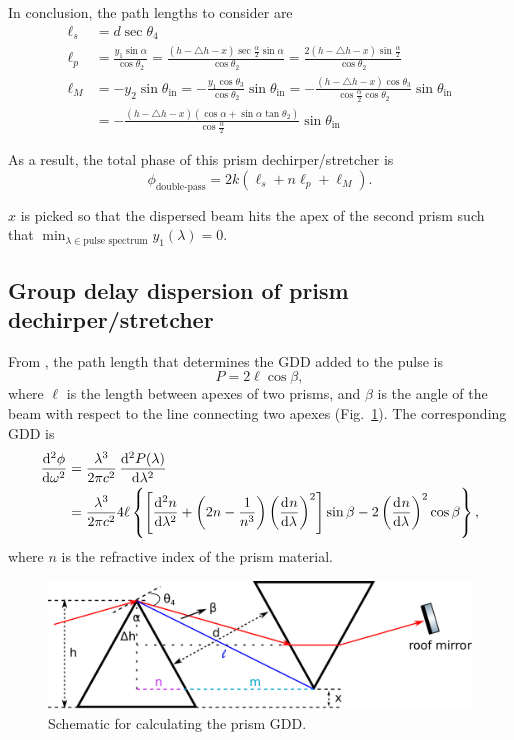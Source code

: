 \documentclass[12pt,hidelinks]{book}
\begin{document}
In conclusion, the path lengths to consider are
\begin{subequations}
\begin{align}
\ell_s & =d\sec\theta_4 \\
\ell_p & =\frac{y_1\sin\alpha}{\cos\theta_2}=\frac{\left(h-\triangle h-x\right)\sec\frac{\alpha}{2}\sin\alpha}{\cos\theta_2}=\frac{2\left(h-\triangle h-x\right)\sin\frac{\alpha}{2}}{\cos\theta_2} \\
\ell_M & =-y_2\sin\theta_{\text{in}}=-\frac{y_1\cos\theta_3}{\cos\theta_2}\sin\theta_{\text{in}}=-\frac{\left(h-\triangle h-x\right)\cos\theta_3}{\cos\frac{\alpha}{2}\cos\theta_2}\sin\theta_{\text{in}} \\
& =-\frac{\left(h-\triangle h-x\right)\left(\cos\alpha+\sin\alpha\tan\theta_2\right)}{\cos\frac{\alpha}{2}}\sin\theta_{\text{in}}
\end{align}
\end{subequations}

As a result, the total phase of this prism dechirper/stretcher is
\begin{equation}
\phi_{\text{double-pass}}=2k\left(\ell_s+n\ell_p+\ell_M\right).
\end{equation}

$x$ is picked so that the dispersed beam hits the apex of the second prism such that $\min_{\lambda\in\text{pulse spectrum}} y_1(\lambda)=0$.

\subsection{Group delay dispersion of prism dechirper/stretcher}
From \cite{Fork1984}, the path length that determines the GDD added to the pulse is 
\begin{equation}
P=2\ell\cos\beta,
\end{equation}
where $\ell$ is the length between apexes of two prisms, and $\beta$ is the angle of the beam with respect to the line connecting two apexes (Fig.~\ref{fig:prism_GDD}). The corresponding GDD is
\begin{align}
\dod[2]{\phi}{\omega} & =\frac{\lambda^3}{2\pi c^2}\dod[2]{P(\lambda)}{\lambda} \nonumber \\
& =\frac{\lambda^3}{2\pi c^2}4\ell\left\{\left[\dod[2]{n}{\lambda}+\left(2n-\frac{1}{n^3}\right)\left(\dod{n}{\lambda}\right)^2\right]\sin\beta-2\left(\dod{n}{\lambda}\right)^2\cos\beta\right\},
\label{eq:prism_GDD}
\end{align}
where $n$ is the refractive index of the prism material.
\begin{figure}[htbp]
\centering
\includegraphics[width=\linewidth]{prism_GDD.pdf}
\caption{Schematic for calculating the prism GDD.}
\label{fig:prism_GDD}
\end{figure}
\end{document}

